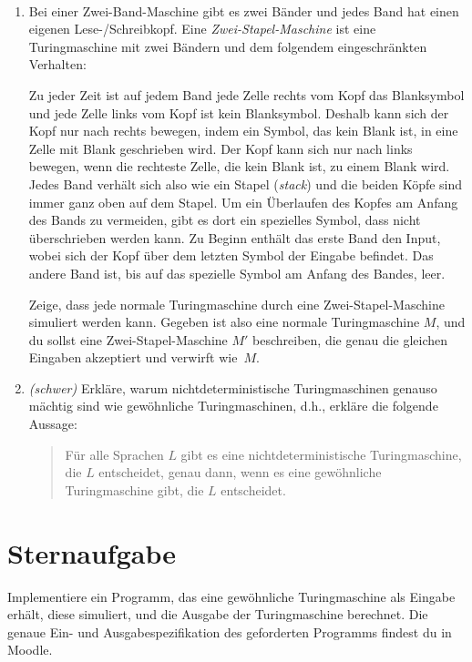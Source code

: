 \documentclass{uebung_cs}
\begin{document}
\begin{aufgabe}[Turingmaschinen V]\
	\begin{enumerate}
		\item Bei einer Zwei-Band-Maschine gibt es zwei Bänder und jedes Band hat einen eigenen Lese-/Schreibkopf.
		Eine \emph{Zwei-Stapel-Maschine} ist eine Turingmaschine mit zwei Bändern und dem folgendem eingeschränkten Verhalten:
		
		Zu jeder Zeit ist auf jedem Band jede Zelle rechts vom Kopf das Blanksymbol und jede Zelle links vom Kopf ist kein Blanksymbol. Deshalb kann sich der Kopf nur nach rechts bewegen, indem ein Symbol, das kein Blank ist, in eine Zelle mit Blank geschrieben wird. Der Kopf kann sich nur nach links bewegen, wenn die rechteste Zelle, die kein Blank ist, zu einem Blank wird. Jedes Band verhält sich also wie ein Stapel (\emph{stack}) und die beiden Köpfe sind immer ganz oben auf dem Stapel. Um ein Überlaufen des Kopfes am Anfang des Bands zu vermeiden, gibt es dort ein spezielles Symbol, dass nicht überschrieben werden kann. Zu Beginn enthält das erste Band den Input, wobei sich der Kopf über dem letzten Symbol der Eingabe befindet. Das andere Band ist, bis auf das spezielle Symbol am Anfang des Bandes, leer.
		
		Zeige, dass jede normale Turingmaschine durch eine Zwei-Stapel-Maschine simuliert werden kann. Gegeben ist also eine normale Turingmaschine $M$, und du sollst eine Zwei-Stapel-Maschine $M'$ beschreiben, die genau die gleichen Eingaben akzeptiert und verwirft wie~$M$.
		
		\item \emph{(schwer)} Erkläre, warum nichtdeterministische Turingmaschinen genauso mächtig sind wie gewöhnliche Turingmaschinen, d.h., erkläre die folgende Aussage:
		\begin{quote}
			Für alle Sprachen $L$ gibt es eine nichtdeterministische Turingmaschine, die $L$ entscheidet, genau dann, wenn es eine gewöhnliche Turingmaschine gibt, die $L$ entscheidet.
		\end{quote}
	\end{enumerate}
\end{aufgabe}


\section*{Sternaufgabe}

\begin{aufgabe}[\emoji{star}: Turingmaschine simulieren (Coderunner)]
  Implementiere ein Programm, das eine gewöhnliche Turingmaschine als Eingabe erhält, diese simuliert, und die Ausgabe der Turingmaschine berechnet. Die genaue Ein- und Ausgabespezifikation des geforderten Programms findest du in Moodle.
\end{aufgabe}
\end{document}
